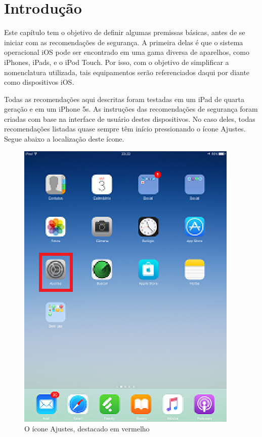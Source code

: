 \chapter{Introdu\c c\~ao}

Este cap\'itulo tem o objetivo de definir algumas premissas b\'asicas, antes de se iniciar com as recomenda\c c\~oes de seguran\c ca. A primeira delas \'e que o sistema operacional iOS pode ser encontrado em uma gama diversa de aparelhos, como iPhones, iPads, e o iPod Touch. Por isso, com o objetivo de simplificar a nomenclatura utilizada, tais equipamentos ser\~ao referenciados daqui por diante como dispositivos iOS. 

Todas as recomenda\c c\~oes aqui descritas foram testadas em um iPad de quarta gera\c c\~ao e em um iPhone 5s. As instru\c c\~oes das recomenda\c c\~oes de seguran\c ca foram criadas com base na interface de usu\'ario destes dispositivos. No caso deles, todas recomenda\c c\~oes listadas quase sempre t\^em in\'icio pressionando o \'icone Ajustes. Segue abaixo a localiza\c c\~ao deste \'icone.

\begin{figure}[h]
  \centering
  \includegraphics{imagem1.eps}
  \caption{O \'icone Ajustes, destacado em vermelho}
\end{figure}


